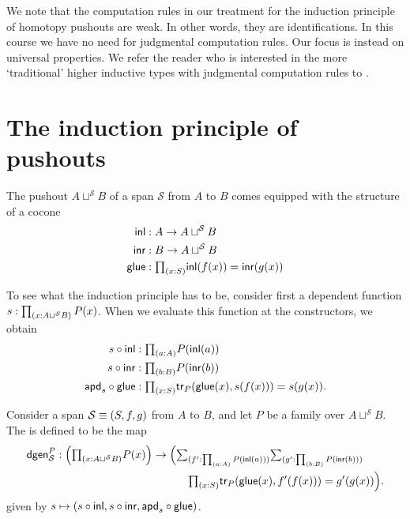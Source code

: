 We note that the computation rules in our treatment for the induction principle of homotopy pushouts are weak. In other words, they are identifications. In this course we have no need for judgmental computation rules. Our focus is instead on universal properties. We refer the reader who is interested in the more `traditional' higher inductive types with judgmental computation rules to \cite{hottbook}.

\section{The induction principle of pushouts}

The pushout $A\sqcup^{\mathcal{S}} B$ of a span $\mathcal{S}$ from $A$ to $B$ comes equipped with the structure of a cocone
\begin{align*}
\inl & : A \to A \sqcup^{\mathcal{S}} B \\
\inr & : B \to A \sqcup^{\mathcal{S}} B \\
\glue & : \prd{x:S} \inl(f(x))=\inr(g(x))
\end{align*}


To see what the induction principle has to be, consider first a dependent function $s:\prd{x:A\sqcup^{\mathcal{S}}B}P(x)$. When we evaluate this function at the constructors, we obtain
\begin{align*}
s\circ \inl & : \prd{a:A} P(\inl(a)) \\
s\circ \inr & : \prd{b:B} P(\inr(b)) \\
\apdfunc{s}\circ \glue & : \prd{x:S} \mathsf{tr}_P(\glue(x),s(f(x)))=s(g(x)).
\end{align*}

\begin{defn}
Consider a span $\mathcal{S}\equiv (S,f,g)$ from $A$ to $B$, and let $P$ be a family over $A\sqcup^{\mathcal{S}} B$. The  is defined to be the map
\begin{align*}
\mathsf{dgen}_{\mathcal{S}}^P & : \Big(\prd{x:A\sqcup^{\mathcal{S}} B} P(x)\Big) \to \Big(\sm{f': \prd{a:A}P(\inl(a))}{g':\prd{b:B}P(\inr(b))}\Big.\\
& \qquad\qquad\qquad\qquad\qquad\qquad \Big.\prd{x:S} \mathsf{tr}_P(\glue(x),f'(f(x)))=g'(g(x))\Big).
\end{align*}
given by $s\mapsto (s\circ{\mathsf{inl}},s\circ{\mathsf{inr}},\mathsf{apd}_{s}\circ\mathsf{glue})$.
\end{defn}

